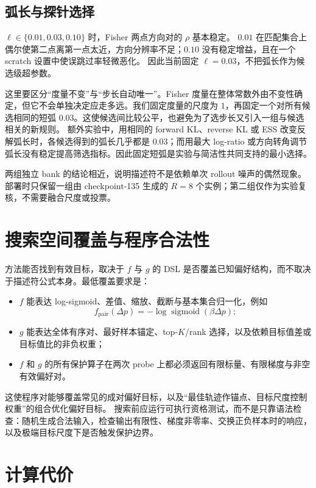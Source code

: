 \documentclass[UTF8,11pt]{ctexart}
\newcommand{\sigmoid}{\operatorname{sigmoid}}
\begin{document}
\subsection{弧长与探针选择}

$\ell\in\{0.01,0.03,0.10\}$ 时，Fisher 两点方向对的 $\rho$ 基本稳定。
$0.01$ 在匹配集合上偶尔使第二点离第一点太近，方向分辨率不足；$0.10$ 没有稳定增益，且在一个 scratch 设置中使误跳过率轻微恶化。
因此当前固定 $\ell=0.03$，不把弧长作为候选级超参数。

这里要区分“度量不变”与“步长自动唯一”。Fisher 度量在整体常数外由不变性确定，但它不会单独决定应走多远。我们固定度量的尺度为 $1$，再固定一个对所有候选相同的短弧 $0.03$。这使候选间比较公平，也避免为了选步长又引入一组与候选相关的新规则。
额外实验中，用相同的 forward KL、reverse KL 或 ESS 改变反解弧长时，各候选得到的弧长几乎都是 $0.03$；而用最大 log-ratio 或方向转角调节弧长没有稳定提高筛选指标。因此固定短弧是实验与简洁性共同支持的最小选择。

两组独立 bank 的结论相近，说明描述符不是依赖单次 rollout 噪声的偶然现象。
部署时只保留一组由 checkpoint-135 生成的 $R=8$ 个实例；第二组仅作为实验复核，不需要融合尺度或投票。

\Needspace{0.38\textheight}
\section{搜索空间覆盖与程序合法性}

方法能否找到有效目标，取决于 $f$ 与 $g$ 的 DSL 是否覆盖已知偏好结构，而不取决于描述符公式本身。最低覆盖要求是：
\begin{itemize}
  \item $f$ 能表达 log-sigmoid、差值、缩放、截断与基本集合归一化，例如
  \[
  f_{\mathrm{pair}}(\Delta p)=-\log\sigmoid(\beta\Delta p);
  \]
  \item $g$ 能表达全体有序对、最好样本锚定、top-$K$/rank 选择，以及依赖目标值差或目标值比的非负权重；
  \item $f$ 和 $g$ 的所有保护算子在两次 probe 上都必须返回有限标量、有限梯度与非空有效偏好对。
\end{itemize}

这使程序对能够覆盖常见的成对偏好目标，以及“最佳轨迹作锚点、目标尺度控制权重”的组合优化偏好目标。
搜索前应运行可执行资格测试，而不是只靠语法检查：随机生成合法输入，检查输出有限性、梯度非零率、交换正负样本时的响应，以及极端目标尺度下是否触发保护边界。

\section{计算代价}
\end{document}
